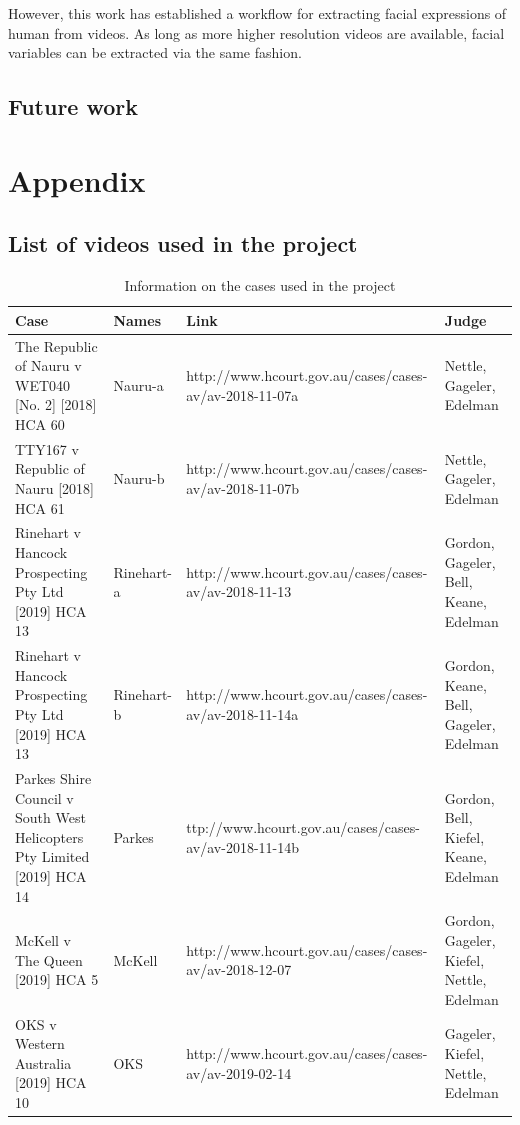 \documentclass{monashthesis}
\begin{document}
However, this work has established a workflow for extracting facial expressions of human from videos. As long as more higher resolution videos are available, facial variables can be extracted via the same fashion.

\hypertarget{future-work}{%
\section{Future work}\label{future-work}}

\appendix

\hypertarget{appendix}{%
\chapter{Appendix}\label{appendix}}

\hypertarget{list-of-videos-used-in-the-project}{%
\section{List of videos used in the project}\label{list-of-videos-used-in-the-project}}

\begin{table}[ht]
\begin{center}
\caption{\label{tab:case-info} Information on the cases used in the project}
\begin{tabular}{llll}
\toprule
Case & Names & Link & Judge \\
\midrule
The Republic of Nauru v WET040 [No. 2] [2018] HCA 60 & Nauru-a & http://www.hcourt.gov.au/cases/cases-av/av-2018-11-07a & Nettle, Gageler, Edelman \\
TTY167 v Republic of Nauru [2018] HCA 61 & Nauru-b & http://www.hcourt.gov.au/cases/cases-av/av-2018-11-07b & Nettle, Gageler, Edelman \\
Rinehart v Hancock Prospecting Pty Ltd [2019] HCA 13 & Rinehart-a & http://www.hcourt.gov.au/cases/cases-av/av-2018-11-13 & Gordon, Gageler, Bell, Keane, Edelman \\
Rinehart v Hancock Prospecting Pty Ltd [2019] HCA 13 & Rinehart-b & http://www.hcourt.gov.au/cases/cases-av/av-2018-11-14a & Gordon, Keane, Bell, Gageler, Edelman \\
Parkes Shire Council v South West Helicopters Pty Limited [2019] HCA 14 & Parkes & ttp://www.hcourt.gov.au/cases/cases-av/av-2018-11-14b & Gordon, Bell, Kiefel, Keane, Edelman \\
McKell v The Queen [2019] HCA 5 & McKell & http://www.hcourt.gov.au/cases/cases-av/av-2018-12-07 & Gordon, Gageler, Kiefel, Nettle, Edelman \\
OKS v Western Australia [2019] HCA 10 & OKS & http://www.hcourt.gov.au/cases/cases-av/av-2019-02-14 & Gageler, Kiefel, Nettle, Edelman \\
\bottomrule
\end{tabular}
\end{center}
\end{table}
\end{document}
